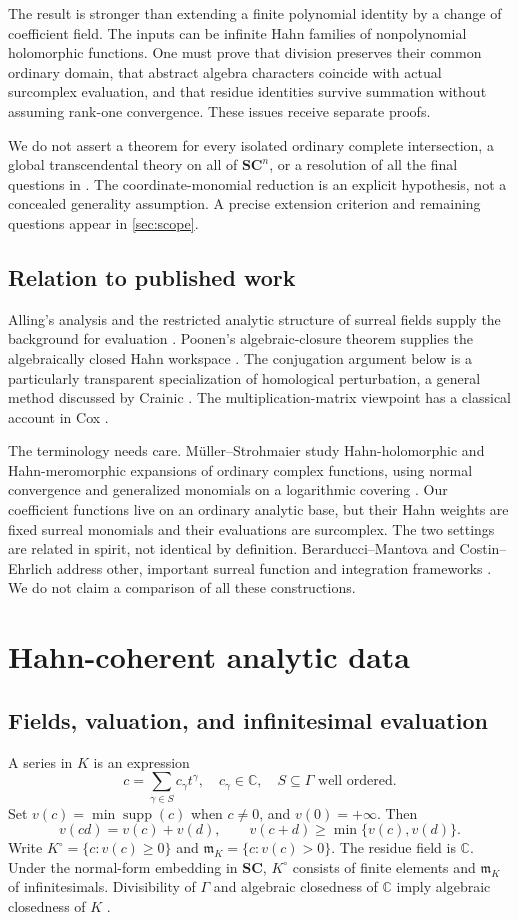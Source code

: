 \documentclass[11pt,letterpaper]{article}
\theoremstyle{definition}
\theoremstyle{remark}
\newcommand{\SC}{\mathbf{SC}}
\newcommand{\C}{\mathbb C}
\newcommand{\mm}{\mathfrak m}
\newcommand{\supp}{\operatorname{supp}}
\numberwithin{equation}{section}
\begin{document}
The result is stronger than extending a finite polynomial identity by a change of coefficient field. The inputs can be infinite Hahn families of nonpolynomial holomorphic functions. One must prove that division preserves their common ordinary domain, that abstract algebra characters coincide with actual surcomplex evaluation, and that residue identities survive summation without assuming rank-one convergence. These issues receive separate proofs.

We do not assert a theorem for every isolated ordinary complete intersection, a global transcendental theory on all of $\SC^n$, or a resolution of all the final questions in \cite{Supplied}. The coordinate-monomial reduction is an explicit hypothesis, not a concealed generality assumption. A precise extension criterion and remaining questions appear in \cref{sec:scope}.

\subsection{Relation to published work}
Alling's analysis and the restricted analytic structure of surreal fields supply the background for evaluation \cite{Alling,vdDE}. Poonen's algebraic-closure theorem supplies the algebraically closed Hahn workspace \cite{Poonen}. The conjugation argument below is a particularly transparent specialization of homological perturbation, a general method discussed by Crainic \cite{Crainic}. The multiplication-matrix viewpoint has a classical account in Cox \cite{Cox}.

The terminology needs care. M\"uller--Strohmaier study Hahn-holomorphic and Hahn-meromorphic expansions of ordinary complex functions, using normal convergence and generalized monomials on a logarithmic covering \cite{MS}. Our coefficient functions live on an ordinary analytic base, but their Hahn weights are fixed surreal monomials and their evaluations are surcomplex. The two settings are related in spirit, not identical by definition. Berarducci--Mantova and Costin--Ehrlich address other, important surreal function and integration frameworks \cite{BM,CE}. We do not claim a comparison of all these constructions.

\section{Hahn-coherent analytic data}\label{sec:setting}
\subsection{Fields, valuation, and infinitesimal evaluation}
A series in $K$ is an expression
\[
 c=\sum_{\gamma\in S}c_\gamma t^\gamma,
 \quad c_\gamma\in\C,\quad S\subseteq\Gamma\text{ well ordered}.
\]
Set $v(c)=\min\supp(c)$ when $c\ne0$, and $v(0)=+\infty$. Then
\[
 v(cd)=v(c)+v(d),\qquad v(c+d)\ge\min\{v(c),v(d)\}.
\]
Write $K^\circ=\{c:v(c)\ge0\}$ and $\mm_K=\{c:v(c)>0\}$. The residue field is $\C$. Under the normal-form embedding in $\SC$, $K^\circ$ consists of finite elements and $\mm_K$ of infinitesimals. Divisibility of $\Gamma$ and algebraic closedness of $\C$ imply algebraic closedness of $K$ \cite[Corollary 4]{Poonen}.
\end{document}

